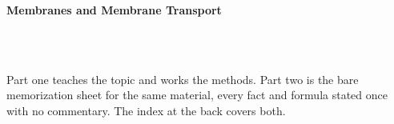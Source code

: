 



\makeindex[title={Index of This Volume},columns=2,intoc]

\begin{titlepage}\thispagestyle{empty}
\vspace*{0.14\textheight}
\noindent{\color{tiercore}\rule{\textwidth}{5pt}}\\[3pt]
\noindent{\color{bioline}\rule{\textwidth}{1pt}}\\[26pt]
\\[12pt]
\noindent\begin{minipage}{\textwidth}\raggedright
{\sffamily\bfseries\fontsize{28}{32}\selectfont\color{bioink}%
 \hyphenchar{} Membranes and Membrane Transport\par}\end{minipage}\\[16pt]
\noindent{\color{biogreen}\rule{\textwidth}{1.4pt}}\\[10pt]
\noindent\begin{minipage}{\textwidth}\raggedright
{\fontsize{10.5}{14}\selectfont\color{biogreen}%
Part one teaches the topic and works the methods. Part two is the bare memorization sheet for the
same material, every fact and formula stated once with no commentary. The index at the back covers both.\par}\end{minipage}
\vfill
\noindent{\color{bioline}\rule{\textwidth}{1pt}}\\[3pt]
\noindent{\color{tiercore}\rule{\textwidth}{5pt}}
\end{titlepage}
\tableofcontents
\clearpage
{}
\clearpage
\printindex

